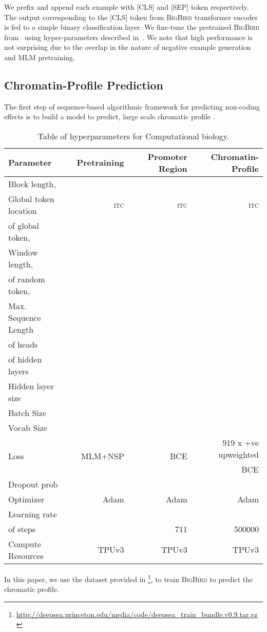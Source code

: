 \documentclass{article}
\newcommand{\bigb}{\textsc{BigBird}\xspace}
\begin{document}
We prefix and append each example with [CLS] and [SEP] token respectively.
The output corresponding to the [CLS] token from \bigb transformer encoder is fed to a simple binary classification layer.
We fine-tune the pretrained \bigb from~ using hyper-parameters described in~.
We note that high performance is not surprising due to the overlap in the nature of negative example generation and MLM pretraining.


\subsection{Chromatin-Profile Prediction}
The first step of sequence-based algorithmic framework for predicting non-coding effects is to build a model to predict, large scale chromatic profile \citep{zhou2015predicting}. 
\begin{table}[b]
\small
\centering
\begin{tabular}{@{} l r r c r c r @{}}
\toprule
Parameter & & Pretraining & & Promoter Region & & Chromatin-Profile \\
\midrule
 Block length,  & &  & & & & \\
Global token location & & \textsc{itc} & & \textsc{itc}& & \textsc{itc} \\
  of global token,  & &  & & & &  \\
 Window length,   & &  & & & &  \\
  of random token,  & &  & & & &  \\
 Max. Sequence Length & &  & & & & \\
  of heads & &  & & & & \\
  of hidden layers & &  & & & &  \\
 Hidden layer size & &  & &  & &  \\
 Batch Size & &  & & & &  \\
 Vocab Size & &  & & & & \\
 \multirow{2}{*}{Loss} & & \multirow{2}{*}{MLM+NSP} & & \multirow{2}{*}{BCE} & & 919 x +ve upweighted \\
  & &  & &  & & BCE \\
 Dropout prob & &  & &  & &  \\
 Optimizer & & Adam & & Adam & & Adam\\
 Learning rate & &   & &  & & \\
  of steps & &  & & 711 && 500000 \\
  Compute Resources & &  TPUv3 & &  TPUv3 & &  TPUv3\\
\bottomrule
\end{tabular}
\vspace{2mm}
\caption{Table of hyperparameters for Computational biology.}
\label{tab:app_bio}
\end{table}
In this paper, we use the dataset provided in \citet{zhou2015predicting}\footnote{ \url{http://deepsea.princeton.edu/media/code/deepsea_train_bundle.v0.9.tar.gz}}, to train \bigb to predict the chromatic profile.
\end{document}
